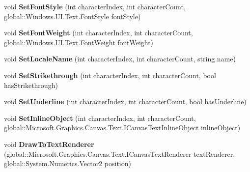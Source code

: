\begin{DoxyCompactItemize}
void {\bfseries Set\+Font\+Style} (int character\+Index, int character\+Count, global\+::\+Windows.\+U\+I.\+Text.\+Font\+Style font\+Style)
\item 
\mbox{\label{class_microsoft_1_1_graphics_1_1_canvas_1_1_text_1_1_canvas_text_layout_a6afdb440ee71967887652cfeb495a190}} 
void {\bfseries Set\+Font\+Weight} (int character\+Index, int character\+Count, global\+::\+Windows.\+U\+I.\+Text.\+Font\+Weight font\+Weight)
\item 
\mbox{\label{class_microsoft_1_1_graphics_1_1_canvas_1_1_text_1_1_canvas_text_layout_afb6740be2f241b804cd331371d94e024}} 
void {\bfseries Set\+Locale\+Name} (int character\+Index, int character\+Count, string name)
\item 
\mbox{\label{class_microsoft_1_1_graphics_1_1_canvas_1_1_text_1_1_canvas_text_layout_adb3d9f62cfff14e9deb741c9b961e3a0}} 
void {\bfseries Set\+Strikethrough} (int character\+Index, int character\+Count, bool has\+Strikethrough)
\item 
\mbox{\label{class_microsoft_1_1_graphics_1_1_canvas_1_1_text_1_1_canvas_text_layout_a5c9ca1a5dab01179d0a389e3298b1f09}} 
void {\bfseries Set\+Underline} (int character\+Index, int character\+Count, bool has\+Underline)
\item 
\mbox{\label{class_microsoft_1_1_graphics_1_1_canvas_1_1_text_1_1_canvas_text_layout_a4d0d027830a031c0d15c1e89b0f84142}} 
void {\bfseries Set\+Inline\+Object} (int character\+Index, int character\+Count, global\+::\+Microsoft.\+Graphics.\+Canvas.\+Text.\+I\+Canvas\+Text\+Inline\+Object inline\+Object)
\item 
\mbox{\label{class_microsoft_1_1_graphics_1_1_canvas_1_1_text_1_1_canvas_text_layout_adcedc6eac15894cd67db704b047bb206}} 
void {\bfseries Draw\+To\+Text\+Renderer} (global\+::\+Microsoft.\+Graphics.\+Canvas.\+Text.\+I\+Canvas\+Text\+Renderer text\+Renderer, global\+::\+System.\+Numerics.\+Vector2 position)

\end{DoxyCompactItemize}
